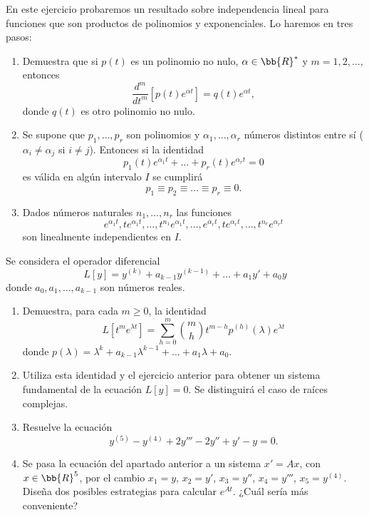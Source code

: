 \begin{ejercicio}\label{ej:5.11}
    En este ejercicio probaremos un resultado sobre independencia lineal para funciones que son productos de polinomios y exponenciales. Lo haremos en tres pasos:
    \begin{enumerate}
        \item Demuestra que si $p(t)$ es un polinomio no nulo, $\alpha\in \bb{R}^*$ y $m = 1, 2, \ldots$, entonces
        \[
            \frac{d^m}{dt^m}\left[p(t)e^{\alpha t}\right] = q(t)e^{\alpha t},
        \]
        donde $q(t)$ es otro polinomio no nulo.
        \item Se supone que $p_1, \ldots, p_r$ son polinomios y $\alpha_1, \ldots, \alpha_r$ números distintos entre sí ($\alpha_i \neq \alpha_j$ si $i \neq j$). Entonces si la identidad
        \[
            p_1(t)e^{\alpha_1t} + \ldots + p_r(t)e^{\alpha_rt} = 0
        \]
        es válida en algún intervalo $I$ se cumplirá
        \[
            p_1 \equiv p_2 \equiv \ldots \equiv p_r \equiv 0.
        \]
        \item Dados números naturales $n_1, \ldots, n_r$ las funciones
        \[
            e^{\alpha_1t}, te^{\alpha_1t}, \ldots, t^{n_1}e^{\alpha_1t}, \ldots, e^{\alpha_rt}, te^{\alpha_rt}, \ldots, t^{n_r}e^{\alpha_rt}
        \]
        son linealmente independientes en $I$.
    \end{enumerate}
\end{ejercicio}

\begin{ejercicio}\label{ej:5.12}
    Se considera el operador diferencial
    \[
        L[y] = y^{(k)} + a_{k-1}y^{(k-1)} + \ldots + a_1y' + a_0y
    \]
    donde $a_0, a_1, \ldots, a_{k-1}$ son números reales.
    \begin{enumerate}
        \item Demuestra, para cada $m \geq 0$, la identidad
        \[
            L\left[t^me^{\lambda t}\right] = \sum_{h = 0}^m \binom{m}{h}t^{m-h}p^{(h)}(\lambda)e^{\lambda t}
        \]
        donde $p(\lambda) = \lambda^k + a_{k-1}\lambda^{k-1} + \ldots + a_1\lambda + a_0$.
        \item Utiliza esta identidad y el ejercicio anterior para obtener un sistema fundamental de la ecuación $L[y] = 0$. Se distinguirá el caso de raíces complejas.
        \item Resuelve la ecuación
        \[
            y^{(5)} - y^{(4)} + 2y''' - 2y'' + y' - y = 0.
        \]
        \item Se pasa la ecuación del apartado anterior a un sistema $x' = Ax$, con $x \in \bb{R}^5$, por el cambio $x_1 = y$, $x_2 = y'$, $x_3 = y''$, $x_4 = y'''$, $x_5 = y^{(4)}$. Diseña dos posibles estrategias para calcular $e^{At}$. ¿Cuál sería más conveniente?
    \end{enumerate}
\end{ejercicio}


